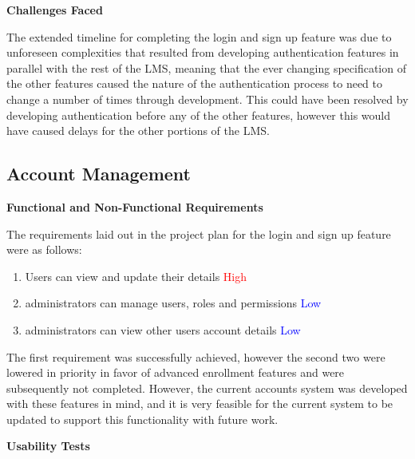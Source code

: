 \textbf{Challenges Faced}

The extended timeline for completing the login and sign up feature was due to unforeseen complexities that resulted from developing authentication features in parallel with the rest of the LMS, meaning that the ever changing specification of the other features caused the nature of the authentication process to need to change a number of times through development. This could have been resolved by developing authentication before any of the other features, however this would have caused delays for the other portions of the LMS.


\subsection{Account Management}
\textbf{Functional and Non-Functional Requirements}

The requirements laid out in the project plan for the login and sign up feature were as follows:
    \begin{enumerate}
    \item Users can view and update their details \textcolor{Red}{High}
    \item administrators can manage users, roles and permissions \textcolor{Blue}{Low}
    \item administrators can view other users account details \textcolor{Blue}{Low}
    \end{enumerate}
The first requirement was successfully achieved, however the second two were lowered in priority in favor of advanced enrollment features and were subsequently not completed. However, the current accounts system was developed with these features in mind, and it is very feasible for the current system to be updated to support this functionality with future work. 

\textbf{Usability Tests}

